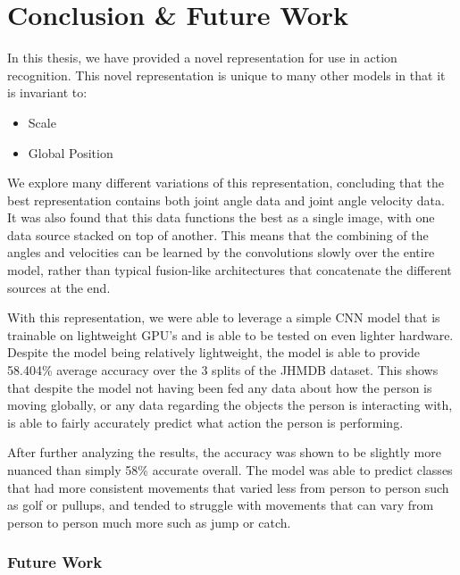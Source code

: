 
\chapter{Conclusion \& Future Work} %

\label{Conclusion}

In this thesis, we have provided a novel representation for use in action recognition. This novel representation is unique to many other models in that it is invariant to:

\begin{itemize}
	\item Scale
	\item Global Position
\end{itemize}

We explore many different variations of this representation, concluding that the best representation contains both joint angle data and joint angle velocity data. It was also found that this data functions the best as a single image, with one data source stacked on top of another. This means that the combining of the angles and velocities can be learned by the convolutions slowly over the entire model, rather than typical fusion-like architectures that concatenate the different sources at the end.

With this representation, we were able to leverage a simple CNN model that is trainable on lightweight GPU's and is able to be tested on even lighter hardware. Despite the model being relatively lightweight, the model is able to provide 58.404\% average accuracy over the 3 splits of the JHMDB dataset. This shows that despite the model not having been fed any data about how the person is moving globally, or any data regarding the objects the person is interacting with, is able to fairly accurately predict what action the person is performing.

After further analyzing the results, the accuracy was shown to be slightly more nuanced than simply 58\% accurate overall. The model was able to predict classes that had more consistent movements that varied less from person to person such as golf or pullups, and tended to struggle with movements that can vary from person to person much more such as jump or catch.

\subsection{Future Work}

